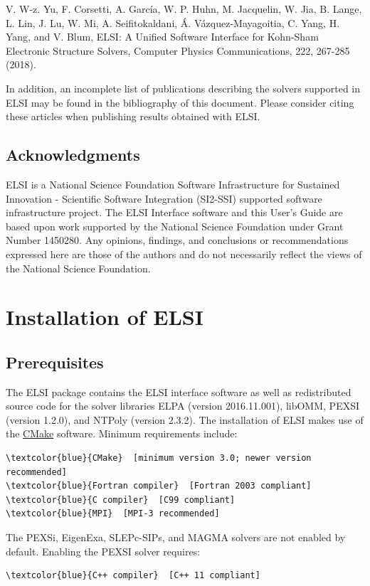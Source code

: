\documentclass{report}
\begin{document}
V. W-z. Yu, F. Corsetti, A. Garc\'{i}a, W. P. Huhn, M. Jacquelin, W. Jia, B. Lange, L. Lin, J. Lu, W. Mi, A. Seifitokaldani, \'{A}. V\'{a}zquez-Mayagoitia, C. Yang, H. Yang, and V. Blum, ELSI: A Unified Software Interface for Kohn-Sham Electronic Structure Solvers, Computer Physics Communications, 222, 267-285 (2018).

In addition, an incomplete list of publications describing the solvers supported in ELSI may be found in the bibliography of this document. Please consider citing these articles when publishing results obtained with ELSI.

\section{Acknowledgments}
\label{sec:thanks}
ELSI is a National Science Foundation Software Infrastructure for Sustained Innovation - Scientific Software Integration (SI2-SSI) supported software infrastructure project. The ELSI Interface software and this User's Guide are based upon work supported by the National Science Foundation under Grant Number 1450280. Any opinions, findings, and conclusions or recommendations expressed here are those of the authors and do not necessarily reflect the views of the National Science Foundation.

\chapter{Installation of ELSI}
\section{Prerequisites}
\label{sec:prereq}
The ELSI package contains the ELSI interface software as well as redistributed source code for the solver libraries ELPA (version 2016.11.001), libOMM, PEXSI (version 1.2.0), and NTPoly (version 2.3.2). The installation of ELSI makes use of the \href{http://cmake.org}{CMake} software. Minimum requirements include:
\begin{Verbatim}[commandchars=\\\{\}]
\textcolor{blue}{CMake}  [minimum version 3.0; newer version recommended]
\textcolor{blue}{Fortran compiler}  [Fortran 2003 compliant]
\textcolor{blue}{C compiler}  [C99 compliant]
\textcolor{blue}{MPI}  [MPI-3 recommended]
\end{Verbatim}

The PEXSi, EigenExa, SLEPc-SIPs, and MAGMA solvers are not enabled by default. Enabling the PEXSI solver requires:
\begin{Verbatim}[commandchars=\\\{\}]
\textcolor{blue}{C++ compiler}  [C++ 11 compliant]
\end{Verbatim}
\end{document}
